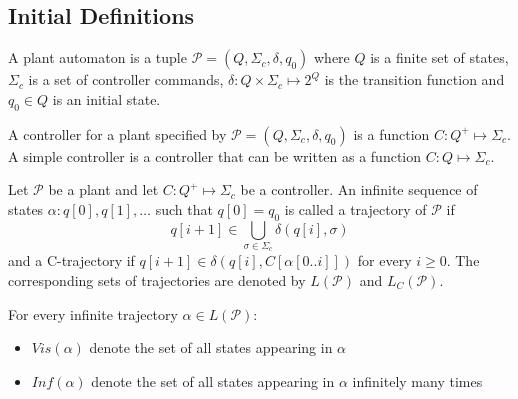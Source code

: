 \documentclass[table]{beamer}
\newcommand{\Plant}{\ensuremath{\mathcal{P}=(Q,\Sigma_c,\delta, q_0)}}
\newcommand{\Controller}{\ensuremath{C:Q^+\longmapsto \Sigma_c}}
\begin{document}
\subsection{Initial Definitions}
\begin{frame}
	\begin{dfn}[Plant]
		A plant automaton is a tuple $\Plant$ where
		$Q$ is a finite set of states, $\Sigma_c$ is a set of controller commands, 
		$\delta:Q \times \Sigma_c \longmapsto 2^Q$ is the transition function and 
		$q_0 \in Q$ is an initial state.
	\end{dfn}

	\begin{dfn}[Controllers]
		A controller for a plant specified by $\Plant$ 
		is a function $\Controller$. A simple controller is a controller that 
		can be written as a function $C:Q \longmapsto \Sigma_c$.
	\end{dfn}
\end{frame}

\begin{frame}
	\begin{dfn}[Trajectories]
		Let $\mathcal{P}$ be a plant and let $\Controller$ be a controller. 
		An infinite sequence of states $\alpha:q[0],q[1],\ldots$ such that
		 $q[0]=q_0$ is called a trajectory of $\mathcal{P}$ if 
		$$q[i+1] \in \bigcup_{\sigma \in \Sigma_c}\delta(q[i],\sigma)$$
		and a C-trajectory if $q[i+1] \in \delta(q[i],C[\alpha[0..i]])$ for every $i\geq 0$.
		The corresponding sets of trajectories are denoted by $L(\mathcal{P})$ and $L_C(\mathcal{P})$.
	\end{dfn}
\end{frame}

\begin{frame}
	For every infinite trajectory $\alpha \in L(\mathcal{P})$:
	\begin{itemize}
		\item $Vis(\alpha)$ denote the set of all states appearing in $\alpha$
		\item $Inf(\alpha)$ denote the set of all states appearing in $\alpha$ infinitely many times
	\end{itemize}
\end{frame}
\end{document}
